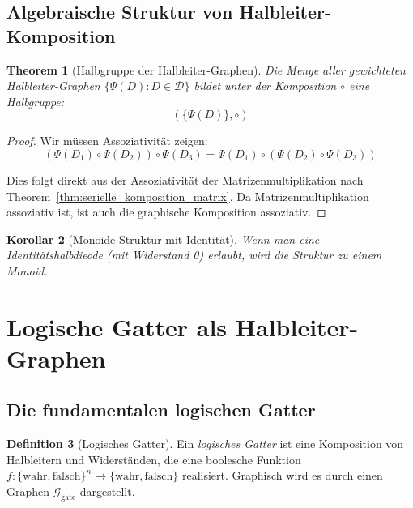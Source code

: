 \documentclass[12pt, a4paper]{article}
\newtheorem{theorem}{Theorem}[section]
\newtheorem{corollary}[theorem]{Korollar}
\theoremstyle{definition}
\newtheorem{definition}[theorem]{Definition}
\theoremstyle{remark}
\newcommand{\Bool}{\{\mathrm{wahr}, \mathrm{falsch}\}}
\newcommand{\Graph}{\mathcal{G}}
\begin{document}
\subsection{Algebraische Struktur von Halbleiter-Komposition}
\label{subsec:algebraische_struktur}

\begin{theorem}[Halbgruppe der Halbleiter-Graphen]
\label{thm:halbgruppe_halbleiter}
Die Menge aller gewichteten Halbleiter-Graphen $\{\Psi(D) : D \in \mathcal{D}\}$ bildet unter der Komposition $\circ$ eine Halbgruppe:
\[
  (\{\Psi(D)\}, \circ)
\]
\end{theorem}

\begin{proof}
Wir müssen Assoziativität zeigen:
\[
  (\Psi(D_1) \circ \Psi(D_2)) \circ \Psi(D_3) = \Psi(D_1) \circ (\Psi(D_2) \circ \Psi(D_3))
\]

Dies folgt direkt aus der Assoziativität der Matrizenmultiplikation nach Theorem~\ref{thm:serielle_komposition_matrix}. Da Matrizenmultiplikation assoziativ ist, ist auch die graphische Komposition assoziativ.
\end{proof}

\begin{corollary}[Monoide-Struktur mit Identität]
Wenn man eine Identitätshalbdieode (mit Widerstand 0) erlaubt, wird die Struktur zu einem Monoid.
\end{corollary}

\section{Logische Gatter als Halbleiter-Graphen}
\label{sec:schaltkreise}

\subsection{Die fundamentalen logischen Gatter}
\label{subsec:fundamentale_gatter}

\begin{definition}[Logisches Gatter]
\label{def:logisches_gatter}
Ein \emph{logisches Gatter} ist eine Komposition von Halbleitern und Widerständen, die eine boolesche Funktion $f: \Bool^n \to \Bool$ realisiert. Graphisch wird es durch einen Graphen $\Graph_{\mathrm{gate}}$ dargestellt.
\end{definition}
\end{document}
